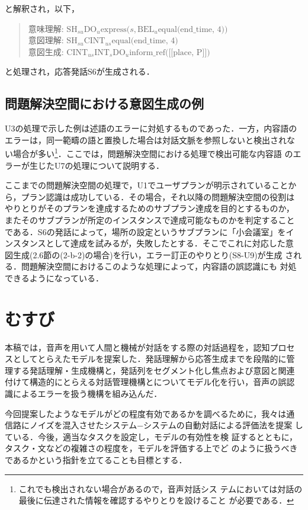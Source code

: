 と解釈され，以下，

\smallskip
\begin{quote}
意味理解: $\mbox{SH}_{su} \mbox{DO}_u \mbox{express(} s,
\mbox{BEL}_u \mbox{equal(end\_time, 4))}$\\
意図理解: $\mbox{SH}_{su} \mbox{CINT}_{us} 
\mbox{equal(end\_time, 4)}$\\
意図生成: $\mbox{CINT}_{us} \mbox{INT}_s \mbox{DO}_u
\mbox{inform\_ref([[place, P]])}$
\end{quote}
\smallskip

と処理され，応答発話S6が生成される．

\subsection{問題解決空間における意図生成の例}

U3の処理で示した例は述語のエラーに対処するものであった．一方，内容語の
エラーは，同一範疇の語と置換した場合は対話文脈を参照しないと検出されな
い場合が多い\footnote{これでも検出されない場合があるので，音声対話シス
テムにおいては対話の最後に伝達された情報を確認するやりとりを設けること
が必要である．}．ここでは，問題解決空間における処理で検出可能な内容語
のエラーが生じたU7の処理について説明する．

ここまでの問題解決空間の処理で，U1でユーザプランが明示されていることか
ら，プラン認識は成功している．その場合，それ以降の問題解決空間の役割は
やりとりがそのプランを達成するためのサブプラン達成を目的とするものか，
またそのサブプランが所定のインスタンスで達成可能なものかを判定すること
である．S6の発話によって，場所の設定というサブプランに「小会議室」をイ
ンスタンスとして達成を試みるが，失敗したとする．そこでこれに対応した意
図生成(2.6節の(2-b-2)の場合)を行い，エラー訂正のやりとり(S8-U9)が生成
される．問題解決空間におけるこのような処理によって，内容語の誤認識にも
対処できるようになっている．

\section{むすび}

本稿では，音声を用いて人間と機械が対話をする際の対話過程を，認知プロセ
スとしてとらえたモデルを提案した．発話理解から応答生成までを段階的に管
理する発話理解・生成機構と，発話列をセグメント化し焦点および意図と関連
付けて構造的にとらえる対話管理機構とについてモデル化を行い，音声の誤認
識によるエラーを扱う機構を組み込んだ．

今回提案したようなモデルがどの程度有効であるかを調べるために，我々は通
信路にノイズを混入させたシステム−システムの自動対話による評価法を提案
している\cite{araki97}．今後，適当なタスクを設定し，モデルの有効性を検
証するとともに，タスク・文などの複雑さの程度を，モデルを評価する上でど
のように扱うべきであるかという指針を立てることも目標とする．

